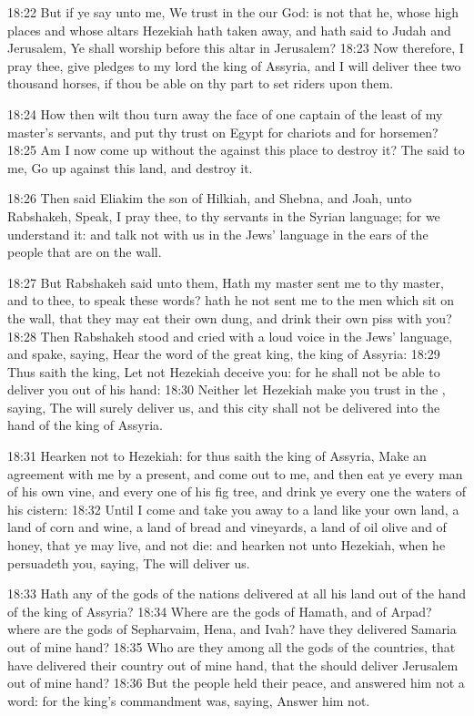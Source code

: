 18:22 But if ye say unto me, We trust in the \LORD our God: is not that
he, whose high places and whose altars Hezekiah hath taken away, and
hath said to Judah and Jerusalem, Ye shall worship before this altar
in Jerusalem?  18:23 Now therefore, I pray thee, give pledges to my
lord the king of Assyria, and I will deliver thee two thousand horses,
if thou be able on thy part to set riders upon them.

18:24 How then wilt thou turn away the face of one captain of the
least of my master's servants, and put thy trust on Egypt for chariots
and for horsemen?  18:25 Am I now come up without the \LORD against
this place to destroy it?  The \LORD said to me, Go up against this
land, and destroy it.

18:26 Then said Eliakim the son of Hilkiah, and Shebna, and Joah, unto
Rabshakeh, Speak, I pray thee, to thy servants in the Syrian language;
for we understand it: and talk not with us in the Jews' language in
the ears of the people that are on the wall.

18:27 But Rabshakeh said unto them, Hath my master sent me to thy
master, and to thee, to speak these words? hath he not sent me to the
men which sit on the wall, that they may eat their own dung, and drink
their own piss with you?  18:28 Then Rabshakeh stood and cried with a
loud voice in the Jews' language, and spake, saying, Hear the word of
the great king, the king of Assyria: 18:29 Thus saith the king, Let
not Hezekiah deceive you: for he shall not be able to deliver you out
of his hand: 18:30 Neither let Hezekiah make you trust in the \LORD,
saying, The \LORD will surely deliver us, and this city shall not be
delivered into the hand of the king of Assyria.

18:31 Hearken not to Hezekiah: for thus saith the king of Assyria,
Make an agreement with me by a present, and come out to me, and then
eat ye every man of his own vine, and every one of his fig tree, and
drink ye every one the waters of his cistern: 18:32 Until I come and
take you away to a land like your own land, a land of corn and wine, a
land of bread and vineyards, a land of oil olive and of honey, that ye
may live, and not die: and hearken not unto Hezekiah, when he
persuadeth you, saying, The \LORD will deliver us.

18:33 Hath any of the gods of the nations delivered at all his land
out of the hand of the king of Assyria?  18:34 Where are the gods of
Hamath, and of Arpad? where are the gods of Sepharvaim, Hena, and
Ivah? have they delivered Samaria out of mine hand?  18:35 Who are
they among all the gods of the countries, that have delivered their
country out of mine hand, that the \LORD should deliver Jerusalem out
of mine hand?  18:36 But the people held their peace, and answered him
not a word: for the king's commandment was, saying, Answer him not.

